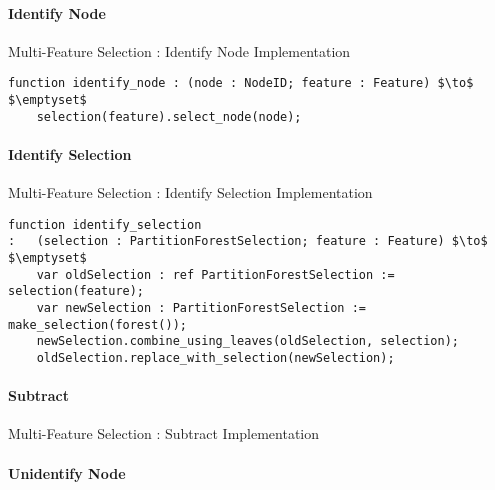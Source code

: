 \paragraph{Identify Node}

\begin{stulisting}[H]
\caption{Multi-Feature Selection : Identify Node Implementation}
\begin{lstlisting}[style=Default]
function identify_node : (node : NodeID; feature : Feature) $\to$ $\emptyset$
	selection(feature).select_node(node);
\end{lstlisting}
\end{stulisting}

\paragraph{Identify Selection}

\begin{stulisting}[H]
\caption{Multi-Feature Selection : Identify Selection Implementation}
\begin{lstlisting}[style=Default]
function identify_selection
:	(selection : PartitionForestSelection; feature : Feature) $\to$ $\emptyset$
	var oldSelection : ref PartitionForestSelection := selection(feature);
	var newSelection : PartitionForestSelection := make_selection(forest());
	newSelection.combine_using_leaves(oldSelection, selection);
	oldSelection.replace_with_selection(newSelection);
\end{lstlisting}
\end{stulisting}

\paragraph{Subtract}

\begin{stulisting}[H]
\caption{Multi-Feature Selection : Subtract Implementation}

\end{stulisting}

\paragraph{Unidentify Node}

